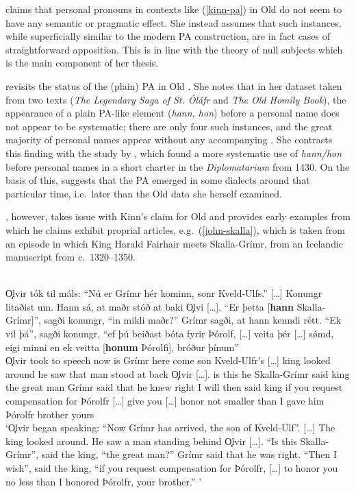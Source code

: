 \documentclass[output=paper,colorlinks,citecolor=brown]{langscibook}
\begin{document}
\citet[165]{Kinn2016-thesis} claims that personal pronouns in contexts like (\ref{kinn-pa}) in Old  do not seem to have any semantic or pragmatic effect. She instead assumes that such instances, while superficially similar to the modern PA construction, are in fact cases of straightforward apposition. This is in line with the theory of null subjects which is the main component of her thesis.

\citet{kinn2017null} revisits the status of the (plain) PA in Old . She notes that in her dataset taken from two texts (\textit{The Legendary Saga of St. Óláfr} and \textit{The Old  Homily Book}), the appearance of a plain PA-like element (\textit{hann, hon}) before a personal name does not appear to be systematic; there are only four such instances, and the great majority of personal names appear without any accompanying . She contrasts this finding with the study by \citet[98]{dahl2015grammaticalization}, which found a more systematic use of \textit{hann/hon} before personal names in a short  charter in the \textit{ Diplomatarium} from 1430. On the basis of this, \citet{kinn2017null} suggests that the PA emerged in some dialects around that particular time, i.e.~later than the Old  data she herself examined. 
 
 
\citet{Johnsen2016}, however, takes issue with Kinn's claim for Old  and provides early examples from  which he claims exhibit proprial articles, e.g.~(\ref{john-skalla}), which is taken from an episode in which King Harald Fairhair meets Skalla-Grímr, from an Icelandic manuscript from c.~1320--1350.
 
 \ea \label{john-skalla}  \\
\gll \c{O}lvir tók til máls: ``Nú er Grímr hér kominn, sonr Kveld-Ulfs.'' [\dots] Konungr litaðist um. Hann sá, at maðr stóð at baki \c{O}lvi [\dots]. ``Er þetta [\textbf{hann} Skalla-Grímr]'', sagði konungr, ``in mikli maðr?'' Grímr sagði, at hann kenndi rétt. ``Ek vil þá'', sagði konungr, ``ef þú beiðast bóta fyrir Þórolf, [\dots] veita þér [\dots] s\'{ø}md, eigi minni en ek veitta [\textbf{honum} Þórolfi], bróður þínum''\\
\c{O}lvir took to speech now is Grímr here come son Kveld-Ulfr's [\dots] king looked around he saw that man stood at back \c{O}lvir [\dots]. is this he Skalla-Grímr said king the great man Grímr said that he knew right I will then said king if you request compensation for Þórolfr [\dots] give you [\dots] honor not smaller than I gave him Þórolfr brother yours\\
\glt  `\c{O}lvir began speaking: ``Now Grímr has arrived, the son of Kveld-Ulf''. [\dots] The king looked around. He saw a man standing behind \c{O}lvir [\dots]. ``Is this Skalla-Grímr'', said the king, ``the great man?'' Grímr said that he was right. ``Then I wish'', said the king, ``if you request compensation for Þórolfr, [\dots] to honor you no less than I honored Þórolfr, your brother.'' '
\citep[197]{Johnsen2016}
\z
 
\end{document}
